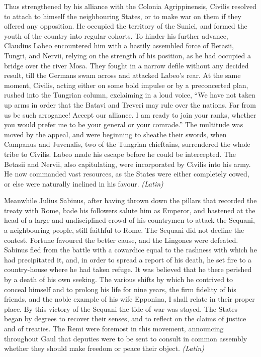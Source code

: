 Thus strengthened by his alliance with the Colonia Agrippinensis, Civilis resolved to attach to himself the neighbouring States, or to make war on them if they offered any opposition. He occupied the territory of the Sunici, and formed the youth of the country into regular cohorts. To hinder his further advance, Claudius Labeo encountered him with a hastily assembled force of Betasii, Tungri, and Nervii, relying on the strength of his position, as he had occupied a bridge over the river Mosa. They fought in a narrow defile without any decided result, till the Germans swam across and attacked Labeo's rear. At the same moment, Civilis, acting either on some bold impulse or by a preconcerted plan, rushed into the Tungrian column, exclaiming in a loud voice, ``We have not taken up arms in order that the Batavi and Treveri may rule over the nations. Far from us be such arrogance! Accept our alliance. I am ready to join your ranks, whether you would prefer me to be your general or your comrade.'' The multitude was moved by the appeal, and were beginning to sheathe their swords, when Campanus and Juvenalis, two of the Tungrian chieftains, surrendered the whole tribe to Civilis. Labeo made his escape before he could be intercepted. The Betasii and Nervii, also capitulating, were incorporated by Civilis into his army. He now commanded vast resources, as the States were either completely cowed, or else were naturally inclined in his favour. \emph{(Latin)}


Meanwhile Julius Sabinus, after having thrown down the pillars that recorded the treaty with Rome, bade his followers salute him as Emperor, and hastened at the head of a large and undisciplined crowd of his countrymen to attack the Sequani, a neighbouring people, still faithful to Rome. The Sequani did not decline the contest. Fortune favoured the better cause, and the Lingones were defeated. Sabinus fled from the battle with a cowardice equal to the rashness with which he had precipitated it, and, in order to spread a report of his death, he set fire to a country-house where he had taken refuge. It was believed that he there perished by a death of his own seeking. The various shifts by which he contrived to conceal himself and to prolong his life for nine years, the firm fidelity of his friends, and the noble example of his wife Epponina, I shall relate in their proper place. By this victory of the Sequani the tide of war was stayed. The States began by degrees to recover their senses, and to reflect on the claims of justice and of treaties. The Remi were foremost in this movement, announcing throughout Gaul that deputies were to be sent to consult in common assembly whether they should make freedom or peace their object. \emph{(Latin)}

